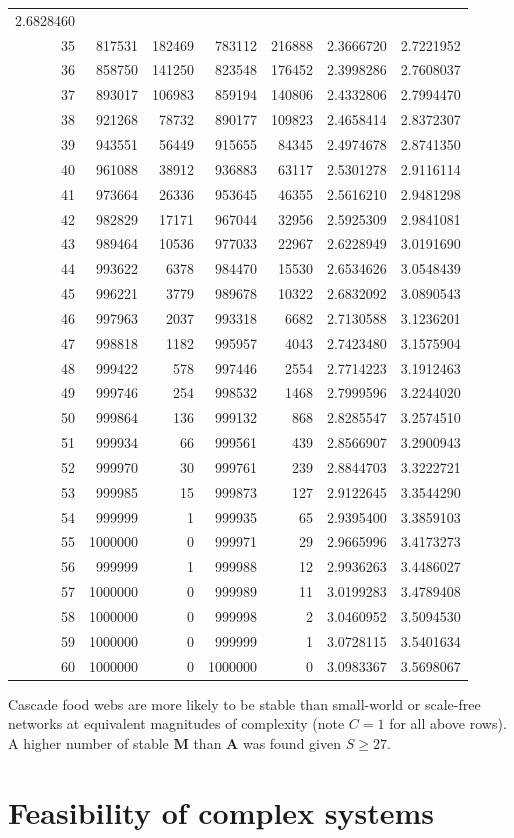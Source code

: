 \documentclass[]{article}
\begin{document}
\begin{longtable}[]{@{}rrrrrrr@{}}
2.6828460\tabularnewline
35 & 817531 & 182469 & 783112 & 216888 & 2.3666720 &
2.7221952\tabularnewline
36 & 858750 & 141250 & 823548 & 176452 & 2.3998286 &
2.7608037\tabularnewline
37 & 893017 & 106983 & 859194 & 140806 & 2.4332806 &
2.7994470\tabularnewline
38 & 921268 & 78732 & 890177 & 109823 & 2.4658414 &
2.8372307\tabularnewline
39 & 943551 & 56449 & 915655 & 84345 & 2.4974678 &
2.8741350\tabularnewline
40 & 961088 & 38912 & 936883 & 63117 & 2.5301278 &
2.9116114\tabularnewline
41 & 973664 & 26336 & 953645 & 46355 & 2.5616210 &
2.9481298\tabularnewline
42 & 982829 & 17171 & 967044 & 32956 & 2.5925309 &
2.9841081\tabularnewline
43 & 989464 & 10536 & 977033 & 22967 & 2.6228949 &
3.0191690\tabularnewline
44 & 993622 & 6378 & 984470 & 15530 & 2.6534626 &
3.0548439\tabularnewline
45 & 996221 & 3779 & 989678 & 10322 & 2.6832092 &
3.0890543\tabularnewline
46 & 997963 & 2037 & 993318 & 6682 & 2.7130588 &
3.1236201\tabularnewline
47 & 998818 & 1182 & 995957 & 4043 & 2.7423480 &
3.1575904\tabularnewline
48 & 999422 & 578 & 997446 & 2554 & 2.7714223 & 3.1912463\tabularnewline
49 & 999746 & 254 & 998532 & 1468 & 2.7999596 & 3.2244020\tabularnewline
50 & 999864 & 136 & 999132 & 868 & 2.8285547 & 3.2574510\tabularnewline
51 & 999934 & 66 & 999561 & 439 & 2.8566907 & 3.2900943\tabularnewline
52 & 999970 & 30 & 999761 & 239 & 2.8844703 & 3.3222721\tabularnewline
53 & 999985 & 15 & 999873 & 127 & 2.9122645 & 3.3544290\tabularnewline
54 & 999999 & 1 & 999935 & 65 & 2.9395400 & 3.3859103\tabularnewline
55 & 1000000 & 0 & 999971 & 29 & 2.9665996 & 3.4173273\tabularnewline
56 & 999999 & 1 & 999988 & 12 & 2.9936263 & 3.4486027\tabularnewline
57 & 1000000 & 0 & 999989 & 11 & 3.0199283 & 3.4789408\tabularnewline
58 & 1000000 & 0 & 999998 & 2 & 3.0460952 & 3.5094530\tabularnewline
59 & 1000000 & 0 & 999999 & 1 & 3.0728115 & 3.5401634\tabularnewline
60 & 1000000 & 0 & 1000000 & 0 & 3.0983367 & 3.5698067\tabularnewline
\bottomrule
\end{longtable}

Cascade food webs are more likely to be stable than small-world or
scale-free networks at equivalent magnitudes of complexity (note 
\(C = 1\) for all above rows). A higher number of stable \(\mathbf{M}\)
than \(\mathbf{A}\) was found given \(S \geq 27\).

\hypertarget{Feasibility}{\section{Feasibility of complex
systems}\label{Feasibility}}
\end{document}
